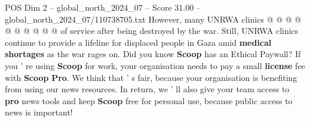 \begin{textsample}{POS Dim 2 – global\_north\_2024\_07 – Score 31.00 – global\_north\_2024\_07/110738705.txt}
However, many UNRWA clinics @ @ @ @ @ @ @ @ @ @ of service after being destroyed by the war.
Still, UNRWA clinics continue to provide a lifeline for displaced people in Gaza amid \textbf{medical} \textbf{shortages} as the war rages on.
Did you know \textbf{Scoop} has an Ethical Paywall?
If you ' re using \textbf{Scoop} for work, your organisation needs to pay a small \textbf{license} fee with \textbf{Scoop} \textbf{Pro}.
We think that ' s fair, because your organisation is benefiting from using our news resources.
In return, we ' ll also give your team access to \textbf{pro} news tools and keep \textbf{Scoop} free for personal use, because public access to news is important!

\end{textsample}
